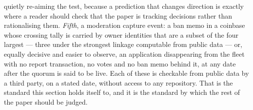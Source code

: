 quietly re-aiming the test, because a prediction that changes direction is exactly where a reader
should check that the paper is tracking decisions rather than rationalising them.
\emph{Fifth}, a moderation capture event: a ban
memo in a coinbase whose crossing tally is carried by owner identities that are a subset of the four
largest --- three under the strongest linkage computable from public data --- or, equally decisive
and easier to observe, an application disappearing from the fleet with no report transaction, no
votes and no ban memo behind it, at any date after the quorum is said to be live. Each of these is
checkable from public data by a third party, on a stated date,
without access to any repository. That is the standard this section holds itself to, and it is the
standard by which the rest of the paper should be judged.

\FloatBarrier

